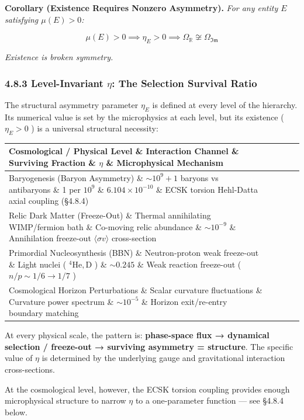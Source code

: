 \documentclass[11pt,a4paper]{article}
\theoremstyle{definition}\newtheorem{definition}{Definition}
\theoremstyle{remark}\newtheorem{remark}{Remark}
\begin{document}
\textbf{Corollary (Existence Requires Nonzero Asymmetry).} \textit{For any entity $E$ satisfying $\mu(E) > 0$:}


\begin{equation}
\mu(E) > 0 \implies \eta_E > 0 \implies \Omega_{\mathbb{R}} \not\cong \Omega_{\mathfrak{Im}}
\end{equation}


\textit{Existence is broken symmetry.}
\subsubsection{4.8.3 Level-Invariant $\eta$: The Selection Survival Ratio}

The structural asymmetry parameter $\eta_E$ is defined at every level of the hierarchy. Its numerical value is set by the microphysics at each level, but its existence ( $\eta_E > 0$ ) is a universal structural necessity:

\begin{longtable}{lllll}
\hline
Cosmological / Physical Level \& Interaction Channel \& Surviving Fraction \& $\eta$ \& Microphysical Mechanism \\
\hline
Baryogenesis (Baryon Asymmetry) \& $\sim 10^9 + 1$ baryons vs antibaryons \& 1 per $10^9$ \& $6.104 \times 10^{-10}$ \& ECSK torsion Hehl-Datta axial coupling (§4.8.4) \\
Relic Dark Matter (Freeze-Out) \& Thermal annihilating WIMP/fermion bath \& Co-moving relic abundance \& $\sim 10^{-9}$ \& Annihilation freeze-out $\langle \sigma v \rangle$ cross-section \\
Primordial Nucleosynthesis (BBN) \& Neutron-proton weak freeze-out \& Light nuclei ( $^4\mathrm{He}, \mathrm{D}$ ) \& $\sim 0.245$ \& Weak reaction freeze-out ( $n/p \sim 1/6 \to 1/7$ ) \\
Cosmological Horizon Perturbations \& Scalar curvature fluctuations \& Curvature power spectrum \& $\sim 10^{-5}$ \& Horizon exit/re-entry boundary matching \\
\hline
\end{longtable}
At every physical scale, the pattern is: \textbf{phase-space flux → dynamical selection / freeze-out → surviving asymmetry = structure}. The specific value of $\eta$ is determined by the underlying gauge and gravitational interaction cross-sections.

At the cosmological level, however, the ECSK torsion coupling provides enough microphysical structure to narrow $\eta$ to a one-parameter function — see §4.8.4 below.
\end{document}
